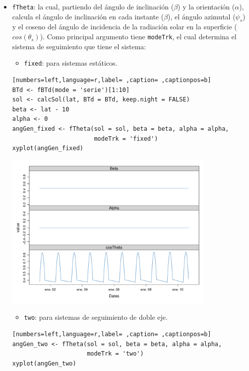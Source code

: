 \begin{itemize}
\item \texttt{fTheta}: la cual, partiendo del ángulo de inclinación (\(\beta\)) y la orientación (\(\alpha\)), calcula el ángulo de inclinación en cada instante (\(\beta\)), el ángulo azimutal (\(\psi_s\)) y el coseno del ángulo de incidencia  de la radiación solar en la superficie (\(cos(\theta_s)\)).
Como principal argumento tiene \texttt{modeTrk}, el cual determina el sistema de seguimiento que tiene el sistema:
\begin{itemize}
\item \texttt{fixed}: para sistemas estáticos.
\end{itemize}
\begin{lstlisting}[numbers=left,language=r,label= ,caption= ,captionpos=b]
BTd <- fBTd(mode = 'serie')[1:10]
sol <- calcSol(lat, BTd = BTd, keep.night = FALSE)
beta <- lat - 10
alpha <- 0
angGen_fixed <- fTheta(sol = sol, beta = beta, alpha = alpha,
                       modeTrk = 'fixed')
xyplot(angGen_fixed)
\end{lstlisting}

\begin{center}
\includegraphics[width=0.8\textwidth]{figuras/codigo-fthetafixed.pdf}
\end{center}
\begin{itemize}
\item \texttt{two}: para sistemas de seguimiento de doble eje.
\end{itemize}
\begin{lstlisting}[numbers=left,language=r,label= ,caption= ,captionpos=b]
angGen_two <- fTheta(sol = sol, beta = beta, alpha = alpha,
                     modeTrk = 'two')
xyplot(angGen_two)
\end{lstlisting}


\end{itemize}
